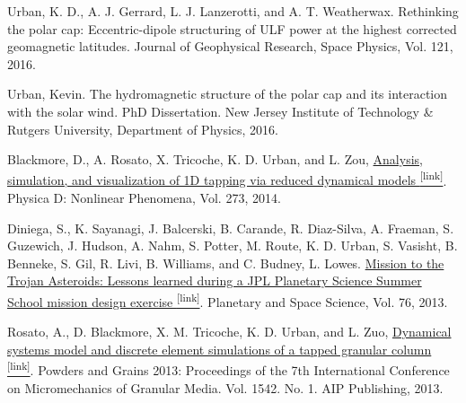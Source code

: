 \begin{itemize*}


  \item \label{itm:sw-2016-eccentric}
    Urban, K. D., A. J. Gerrard, L. J. Lanzerotti, and A. T. Weatherwax.
    Rethinking the polar cap: Eccentric-dipole structuring of ULF power at the highest corrected geomagnetic latitudes.
    Journal of Geophysical Research, Space Physics, Vol. 121, 2016.

  \item \label{itm:sw-2016-phd} 
    Urban, Kevin.
    The hydromagnetic structure of the polar cap and its interaction
    with the solar wind.  PhD Dissertation. 
    New Jersey Institute of Technology \& Rutgers University, 
    Department of Physics, 2016.
    

  \item \label{itm:gran-2014-reduced}
    Blackmore, D., A. Rosato, X. Tricoche, K. D. Urban, and L. Zou,
    \href{http://www.sciencedirect.com/science/article/pii/S0167278914000189}{
    Analysis, simulation, and visualization of 1D tapping via reduced dynamical models 
    \textsuperscript{\tiny{[link]}}}. 
    Physica D: Nonlinear Phenomena, Vol.  273, 2014.

  \item \label{psss-2013-trojan}
    Diniega, S., K. Sayanagi, J. Balcerski, B. Carande, R. Diaz-Silva,
    A. Fraeman, S. Guzewich, J. Hudson, A. Nahm, S. Potter, M. Route, K.
    D. Urban, S. Vasisht, B. Benneke, S. Gil, R. Livi, B. Williams, and C.
    Budney, L. Lowes.
    \href{http://www.sciencedirect.com/science/article/pii/S0032063312003741}{
    Mission to the Trojan Asteroids: Lessons learned during a JPL Planetary Science Summer School mission design exercise 
    \textsuperscript{\tiny{[link]}}}. 
    Planetary and Space Science, Vol. 76, 2013.

  \item \label{itm:gran-2013-simulations}
    Rosato, A., D. Blackmore, X. M. Tricoche, K. D. Urban, and L. Zuo,
    \href{http://scitation.aip.org/content/aip/proceeding/aipcp/10.1063/1.4811931}{
    Dynamical systems model and discrete element simulations of a tapped granular column
    \textsuperscript{\tiny{[link]}}}.
    Powders and Grains 2013: Proceedings of the 7th International Conference 
    on Micromechanics of Granular Media. Vol. 1542. No. 1. AIP Publishing, 2013.


\end{itemize*}
